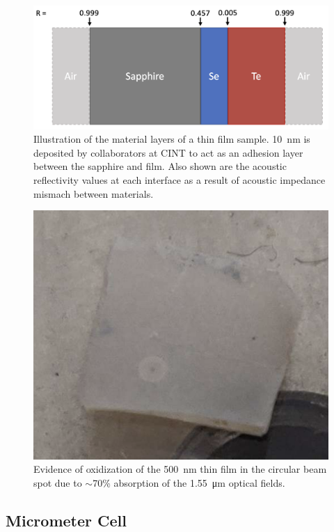 \begin{figure}[t]
  \centering
  \includegraphics[width=.8\textwidth]{figs/4-Raman/AcousticImpedance.png}
  \caption[Illustration of the material layers of a  thin film sample.]{Illustration of the material layers of a  thin film sample. \SI{10}{\nano\meter}  is deposited by collaborators at \ac{CINT} to act as an adhesion layer between the sapphire and  film. Also shown are the acoustic reflectivity values at each interface as a result of acoustic impedance mismach between materials.}
  \label{fig:Raman:AcousticImpedance}
\end{figure}

\begin{figure}[t]
  \centering
  \includegraphics[width=.3\textwidth]{figs/4-Raman/TeTeO2beamspot.png}
  \caption[Evidence of oxidization of the \SI{500}{\nano\meter}  thin film in the circular beam spot.]{Evidence of oxidization of the \SI{500}{\nano\meter}  thin film in the circular beam spot due to \(\sim\)70\% absorption of the \SI{1.55}{\micro\meter} optical fields.}
  \label{fig:Raman:TeTeO2beamspot}
\end{figure}

\subsection{\texorpdfstring{}{CS2} Micrometer Cell}
\label{subsec:Raman:Target:CS2Cells}

